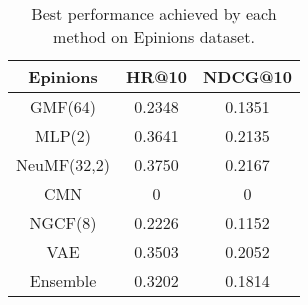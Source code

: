 \begin{table}[h]
    \centering
    \begin{tabular}{c|c|c}
        \hline
        Epinions & HR@10 & NDCG@10 \\
        \hline
        GMF(64)     & 0.2348 & 0.1351 \\
        MLP(2)      & 0.3641 & 0.2135 \\
        NeuMF(32,2) & 0.3750 & 0.2167 \\
        CMN         & 0 & 0 \\
        NGCF(8)     & 0.2226 & 0.1152 \\
        VAE         & 0.3503 & 0.2052 \\
        Ensemble    & 0.3202 & 0.1814
    \end{tabular}
    \caption{Best performance achieved by each method on Epinions dataset.}
    \label{tab:epinions}
\end{table}



